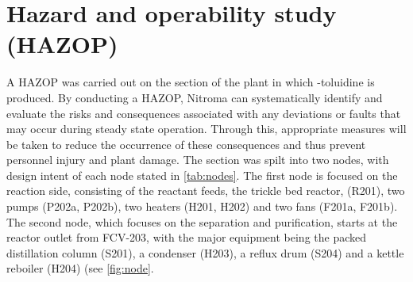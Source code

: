\section{Hazard and operability study (HAZOP) }
\label{sec: HAZOP}
 
A HAZOP was carried out on the section of the plant in which \ortho-toluidine is produced. By conducting a HAZOP, Nitroma can systematically identify and evaluate the risks and consequences associated with any deviations or faults that may occur during steady state operation. Through this, appropriate measures will be taken to reduce the occurrence of these consequences and thus prevent personnel injury and plant damage. The section was spilt into two nodes, with design intent of each node stated in \cref{tab:nodes}. The first node is focused on the reaction side, consisting of the reactant feeds, the trickle bed reactor, (R201), two pumps (P202a, P202b), two heaters (H201, H202) and two fans (F201a, F201b). The second node, which focuses on the separation and purification, starts at the reactor outlet from FCV-203, with the major equipment being the packed distillation column (S201), a condenser (H203), a reflux drum (S204) and a kettle reboiler (H204) (see \ref{fig:node}. 


